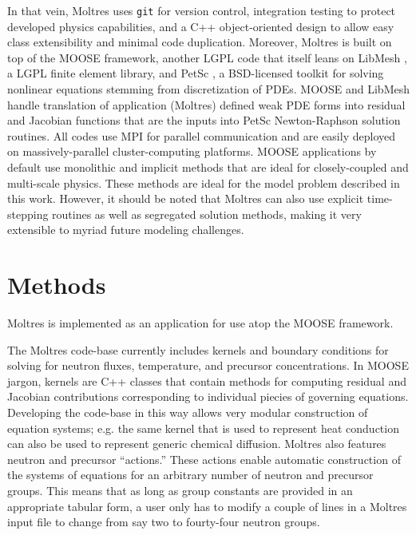 \documentclass{article}
\let\Oldsection\section
\renewcommand{\section}{\FloatBarrier\Oldsection}
\begin{document}
In that vein, Moltres uses
\texttt{git} for version control, integration testing to protect
developed physics capabilities, and a C++ object-oriented design to allow easy
class extensibility and minimal code duplication. Moreover, Moltres is built on
top of the \gls{MOOSE} framework, \cite{gaston_physics-based_2015} another \gls{LGPL}
code that itself leans on LibMesh \cite{kirk2006libmesh}, a \gls{LGPL} finite element
library, and PetSc \cite{petsc-user-ref}, a \gls{BSD}-licensed toolkit for solving nonlinear
equations stemming from discretization of PDEs. \gls{MOOSE} and LibMesh handle
translation of application (Moltres) defined weak PDE forms into residual and
Jacobian functions that are the inputs into PetSc Newton-Raphson solution
routines. All codes use MPI for parallel communication and are easily deployed
on massively-parallel cluster-computing platforms. \gls{MOOSE} applications by default
use monolithic and implicit methods that are ideal for closely-coupled and
multi-scale physics. These methods are ideal for the model problem described in
this work. However, it should be noted that Moltres can also use explicit
time-stepping routines as well as segregated solution methods, making it very 
extensible to myriad future modeling challenges.

\section{Methods}

Moltres \cite{lindsay_arfc/moltres_nodate} is implemented as an application for 
use atop the \gls{MOOSE} \cite{gaston_physics-based_2015} framework.


The Moltres code-base currently includes kernels and boundary conditions for
solving for neutron fluxes, temperature, and precursor concentrations. In \gls{MOOSE}
jargon, kernels are C++ classes that contain methods for computing residual and
Jacobian contributions corresponding to individual piecies of governing
equations. Developing the code-base in this way allows very modular construction
of equation systems; e.g. the same kernel that is used to represent heat
conduction can also be used to represent generic chemical diffusion. Moltres
also features neutron and precursor ``actions.'' These actions enable automatic
construction of the systems of equations for an arbitrary number of neutron and
precursor groups. This means that as long as group constants are provided in an appropriate
tabular form, a user only has to modify a couple of lines in a Moltres input
file to change from say two to fourty-four neutron groups.
\end{document}
